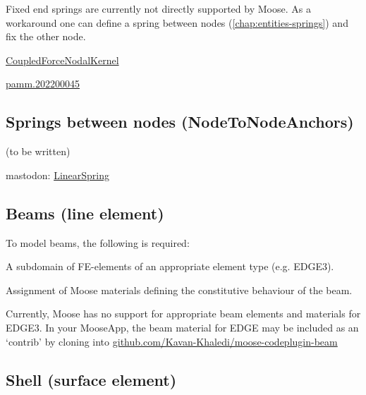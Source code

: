 Fixed end springs are currently not directly supported by Moose. As a
workaround one can define a spring between nodes
(\autoref{chap:entities-springs}) and fix the other node.

\href{https://mooseframework.inl.gov/source/nodalkernels/CoupledForceNodalKernel.html}{CoupledForceNodalKernel}

\href{https://onlinelibrary.wiley.com/doi/pdf/10.1002/pamm.202200045}{pamm.202200045}

\subsection{Springs between nodes (NodeToNodeAnchors)}
\label{chap:entities-springs}

(to be written)

mastodon:
\href{https://mooseframework.inl.gov/mastodon/source/materials/LinearSpring.html}{LinearSpring}

\subsection{Beams (line element)}
\label{chap:entities-beams}

To model beams, the following is required:

\begin{description}[font=$\bullet$~\normalfont]
    \item [subdomain:] A subdomain of FE-elements of an appropriate element type (e.g. EDGE3).
    \item [materials:] Assignment of Moose materials defining the constitutive behaviour of the beam.
\end{description}

Currently, Moose has no support for appropriate beam elements and materials for
EDGE3. In your MooseApp, the beam material for EDGE may be included as an
‘contrib’ by cloning into
\href{https://github.com/Kavan-Khaledi/moose-codeplugin-beam}{github.com/Kavan-Khaledi/moose-codeplugin-beam}


\subsection{Shell (surface element)}
\label{chap:entities-shell}

